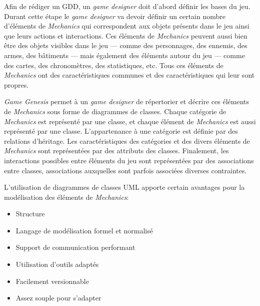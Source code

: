 




Afin de rédiger un GDD, un \emph{game designer} doit d'abord définir les bases du jeu.
Durant cette étape le \emph{game designer} va devoir définir un certain nombre d'\'el\'ements de \emph{Mechanics} qui correspondent aux objets présents dans le jeu ainsi que leurs actions et interactions.
Ces \'el\'ements de \emph{Mechanics} peuvent aussi bien être des objets visibles dans le jeu --- comme des personnages, des ennemis, des armes, des bâtiments --- mais également des \'el\'ements autour du jeu --- comme des cartes, des chronomètres, des statistiques, etc.
Tous ces \'el\'ements de \emph{Mechanics} ont des caractéristiques communes et des caractéristiques qui leur sont propres.

\emph{Game Genesis} permet à un \emph{game designer} de répertorier et décrire ces \'el\'ements de \emph{Mechanics} sous forme de diagrammes de classes.
Chaque catégorie de \emph{Mechanics} est représenté par une classe, et
chaque \'el\'ement de \emph{Mechanics} est aussi représenté par une classe.
L'appartenance à une catégorie est définie par des relations d'héritage.
Les caractéristiques des catégories et des divers \'el\'ements de \emph{Mechanics} sont représentées par des attributs des classes.
Finalement, les interactions possibles entre \'el\'ements du jeu sont représentées par des associations entre classes, associations auxquelles sont parfois associ\'ees diverses contraintes.

L'utilisation de diagrammes de classes UML apporte certain avantages pour la modélisation des \'el\'ements de \emph{Mechanics}:
\begin{itemize}
    \item Structure
    \item Langage de modélisation formel et normalisé
    \item Support de communication performant 
    \item Utilisation d'outils adaptés
    \item Facilement versionnable
    \item Assez souple pour s'adapter 
\end{itemize}

